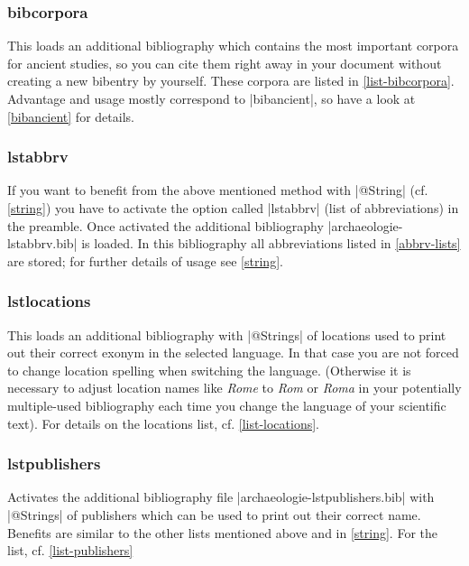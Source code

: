 \documentclass[a4paper,
10pt,
greek,
french,
spanish,
italian,
ngerman,
english
]{ltxdoc}
\begin{document}

\subsubsection{bibcorpora}\label{bibcorpora}
This loads an additional bibliography which contains the most important corpora for ancient studies, so you can cite them right away in your document without creating a new bibentry by yourself. 
These corpora are listed in \cref{list-bibcorpora}. 
Advantage and usage mostly correspond to |bibancient|, 
so have a look at \cref{bibancient} for details.



\subsubsection{lstabbrv}\label{abbrv}
If you want to benefit from the above mentioned method with |@String| (cf. \cref{string}) 
you have to activate the option called |lstabbrv| (list of abbreviations) in the preamble.
Once activated the additional bibliography |archaeologie-lstabbrv.bib| is loaded. 
In this bibliography all abbreviations listed in \cref{abbrv-lists} are stored; 
for further details of usage see \cref{string}.

\subsubsection{lstlocations}\label{lstlocations}
This loads an additional bibliography with |@Strings| of locations used to print out their correct exonym in the selected language. 
In that case you are not forced to change location spelling when switching the language. 
(Otherwise it is necessary to adjust location names like \emph{Rome} to \emph{Rom} or \emph{Roma} 
in your potentially multiple-used bibliography each time you change the language of your scientific text).
For details on the locations list, cf. \cref{list-locations}.

\subsubsection{lstpublishers}\label{lstpublishers}
Activates the additional bibliography file |archaeologie-lstpublishers.bib| with |@Strings| 
of publishers which can be used to print out their correct name. 
Benefits are similar to the other lists mentioned above and in \cref{string}.
For the list, cf. \cref{list-publishers}
\end{document}

